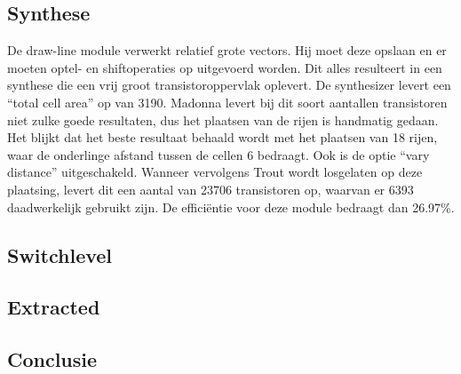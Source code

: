 \documentclass{scrartcl} %
\begin{document}
\subsection{Synthese}
De draw-line module verwerkt relatief grote vectors. Hij moet deze opslaan en er moeten optel- en shiftoperaties op uitgevoerd worden. Dit alles resulteert in een synthese die een vrij groot transistoroppervlak oplevert. De synthesizer levert een ``total cell area'' op van 3190. Madonna levert bij dit soort aantallen transistoren niet zulke goede resultaten, dus het plaatsen van de rijen is handmatig gedaan. Het blijkt dat het beste resultaat behaald wordt met het plaatsen van 18 rijen, waar de onderlinge afstand tussen de cellen 6 bedraagt. Ook is de optie ``vary distance'' uitgeschakeld. Wanneer vervolgens Trout wordt losgelaten op deze plaatsing, levert dit een aantal van 23706 transistoren op, waarvan er 6393 daadwerkelijk gebruikt zijn. De efficiëntie voor deze module bedraagt dan 26.97\%.

\subsection{Switchlevel}


\subsection{Extracted}

\subsection{Conclusie}
\end{document}
